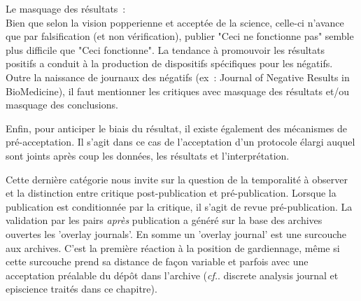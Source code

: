 
Le masquage des résultats~:\\
Bien que selon la vision popperienne et acceptée de la science, celle-ci n'avance que par falsification (et non vérification), publier "Ceci ne fonctionne pas" semble plus difficile que "Ceci fonctionne".
La tendance à promouvoir les résultats positifs a conduit à la production de dispositifs spécifiques pour les négatifs.
Outre la naissance de journaux des négatifs (ex~: Journal of Negative Results in BioMedicine), il faut mentionner les critiques avec masquage des résultats et/ou masquage des conclusions.

Enfin, pour anticiper le biais du résultat, il existe également des mécanismes de pré-acceptation.
Il s'agit dans ce cas de l'acceptation d'un protocole élargi auquel sont joints après coup les données, les résultats et l'interprétation.

Cette dernière catégorie nous invite sur la question de la temporalité à observer et la distinction entre critique post-publication et pré-publication.
Lorsque la publication est conditionnée par la critique, il s'agit de revue pré-publication.
La validation par les pairs \emph{après} publication a généré sur la base des archives ouvertes les 'overlay journals'.
En somme un 'overlay journal' est une surcouche aux archives.
C'est la première réaction à la position de gardiennage, même si cette surcouche prend sa distance de façon variable et parfois avec une acceptation préalable du dépôt dans l'archive (\textit{cf.}. discrete analysis journal et episcience traités dans ce chapitre).

%
%


